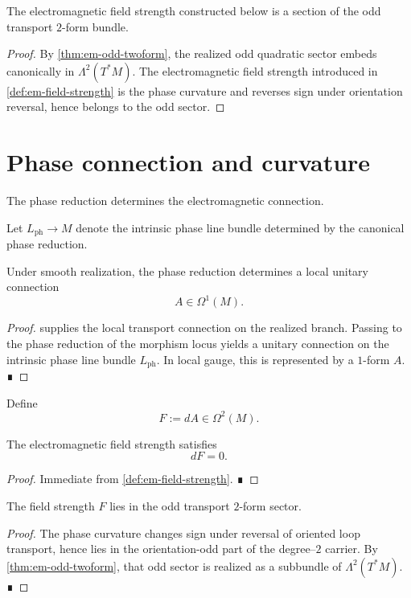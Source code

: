 \begin{corollary}
	The electromagnetic field strength constructed below is a section of the
	odd transport \(2\)-form bundle.
\end{corollary}
\begin{proof}
	By \cref{thm:em-odd-twoform}, the realized odd quadratic sector embeds
	canonically in \(\Lambda^2(T^*M)\).
	The electromagnetic field strength introduced in
	\cref{def:em-field-strength} is the phase curvature and reverses sign
	under orientation reversal, hence belongs to the odd sector.
\end{proof}
\section{Phase connection and curvature}
\label{sec:em-connection-curvature}
The phase reduction determines the electromagnetic connection.
\begin{definition}
	Let \(L_{\mathrm{ph}}\to M\) denote the intrinsic phase line bundle
	determined by the canonical phase reduction.
\end{definition}
\begin{theorem}
	\label{thm:em-phase-connection}
	Under smooth realization, the phase reduction determines a local unitary
	connection
	\[
		A\in \Omega^1(M).
	\]
\end{theorem}
\begin{proof}
	 supplies the
	local transport connection on the realized branch.
	Passing to the phase reduction of the morphism locus yields a unitary
	connection on the intrinsic phase line bundle \(L_{\mathrm{ph}}\).
	In local gauge, this is represented by a \(1\)-form \(A\). ∎
\end{proof}
\begin{definition}
	\label{def:em-field-strength}
	Define
	\[
		F:=dA\in\Omega^2(M).
	\]
\end{definition}
\begin{theorem}
	The electromagnetic field strength satisfies
	\[
		dF=0.
	\]
\end{theorem}
\begin{proof}
	Immediate from \cref{def:em-field-strength}. ∎
\end{proof}
\begin{corollary}
	The field strength \(F\) lies in the odd transport \(2\)-form sector.
\end{corollary}
\begin{proof}
	The phase curvature changes sign under reversal of oriented loop
	transport, hence lies in the orientation-odd part of the degree--\(2\)
	carrier.
	By \cref{thm:em-odd-twoform}, that odd sector is realized as a subbundle
	of \(\Lambda^2(T^*M)\). ∎
\end{proof}
